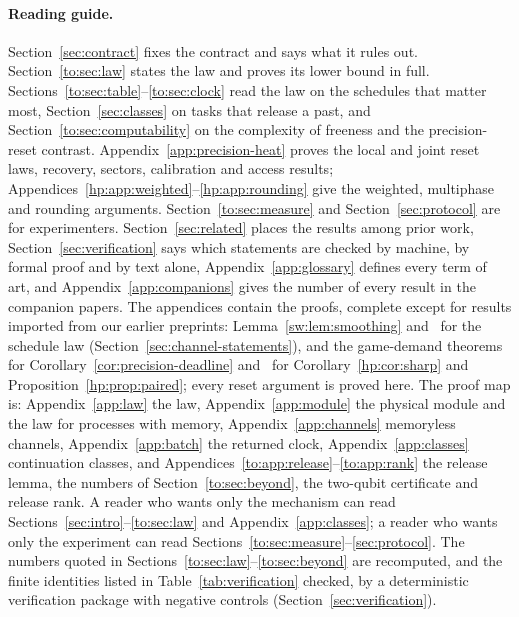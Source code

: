 \paragraph{Reading guide.} Section~\ref{sec:contract} fixes the contract and says what it rules out. Section~\ref{to:sec:law} states the law and proves its lower bound in full. Sections~\ref{to:sec:table}--\ref{to:sec:clock} read the law on the schedules that matter most, Section~\ref{sec:classes} on tasks that release a past, and Section~\ref{to:sec:computability} on the complexity of freeness and the precision-reset contrast. Appendix~\ref{app:precision-heat} proves the local and joint reset laws, recovery, sectors, calibration and access results; Appendices~\ref{hp:app:weighted}--\ref{hp:app:rounding} give the weighted, multiphase and rounding arguments. Section~\ref{to:sec:measure} and Section~\ref{sec:protocol} are for experimenters. Section~\ref{sec:related} places the results among prior work, Section~\ref{sec:verification} says which statements are checked by machine, by formal proof and by text alone, Appendix~\ref{app:glossary} defines every term of art, and Appendix~\ref{app:companions} gives the number of every result in the companion papers. The appendices contain the proofs, complete except for results imported from our earlier preprints: Lemma~\ref{sw:lem:smoothing} and~\cite[Thm.~3.2(a)]{Memory} for the schedule law (Section~\ref{sec:channel-statements}), and the game-demand theorems~\cite[Theorem~1.1]{HPuncomputable} for Corollary~\ref{cor:precision-deadline} and~\cite[Theorem~11.9 and Corollary~11.11]{HPprecision} for Corollary~\ref{hp:cor:sharp} and Proposition~\ref{hp:prop:paired}; every reset argument is proved here. The proof map is: Appendix~\ref{app:law} the law, Appendix~\ref{app:module} the physical module and the law for processes with memory, Appendix~\ref{app:channels} memoryless channels, Appendix~\ref{app:batch} the returned clock, Appendix~\ref{app:classes} continuation classes, and Appendices~\ref{to:app:release}--\ref{to:app:rank} the release lemma, the numbers of Section~\ref{to:sec:beyond}, the two-qubit certificate and release rank. A reader who wants only the mechanism can read Sections~\ref{sec:intro}--\ref{to:sec:law} and Appendix~\ref{app:classes}; a reader who wants only the experiment can read Sections~\ref{to:sec:measure}--\ref{sec:protocol}. The numbers quoted in Sections~\ref{to:sec:law}--\ref{to:sec:beyond} are recomputed, and the finite identities listed in Table~\ref{tab:verification} checked, by a deterministic verification package with negative controls (Section~\ref{sec:verification}).

